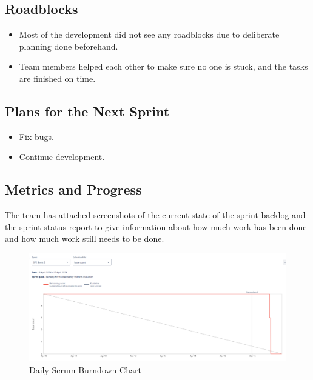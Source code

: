 \documentclass[12pt]{report}
\begin{document}
\subsection*{Roadblocks}
\begin{itemize}
    \item Most of the development did not see any roadblocks due to deliberate planning done beforehand.
    \item Team members helped each other to make sure no one is stuck, and the tasks are finished on time.
\end{itemize}

\subsection*{Plans for the Next Sprint}
\begin{itemize}
    \item Fix bugs.
    \item Continue development.
\end{itemize}

\subsection*{Metrics and Progress}
The team has attached screenshots of the current state of the sprint backlog and the sprint status report to give information about how much work has been done and how much work still needs to be done.

\begin{figure}[H]
  \centering
  \includegraphics[width=1\textwidth]{Resources/3-Sprint/Daily-Scrum/burndownchart_sprint3.png}
  \caption{Daily Scrum Burndown Chart}
  \label{fig:S3Scrum2-image}
\end{figure}
\end{document}

